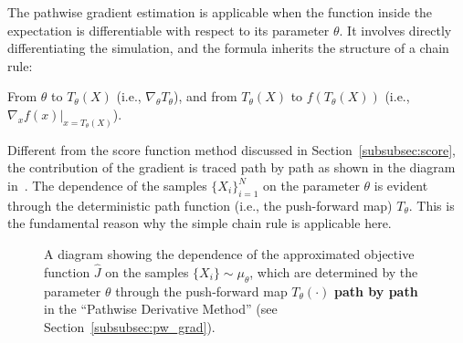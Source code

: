 \documentclass[12pt]{amsart}
\begin{document}
The pathwise gradient estimation is applicable when the function inside the expectation is differentiable with respect to its parameter $\theta$. It involves directly differentiating the simulation, and the formula inherits the structure of a chain rule:
\begin{center}
From $\theta$ to $T_\theta(X)$ (i.e., $\nabla_\theta T_\theta$), and from $T_\theta(X)$ to $f(T_\theta(X))$ (i.e., $\nabla_x f\left(x\right)|_{x=T_\theta(X)}$). \\
\end{center}
Different from the score function method discussed in Section~\ref{subsubsec:score}, the contribution of the gradient is traced path by path as shown in the diagram in~. The dependence of the samples $\{X_i\}_{i=1}^N$ on the parameter $\theta$ is evident through the deterministic path function (i.e., the push-forward map) $T_\theta$. This is the fundamental reason why the simple chain rule is applicable here.  


\begin{figure}
\begin{center}
\usetikzlibrary{arrows.meta}
\end{center}
\caption{A diagram showing the dependence of the approximated objective function $\widehat{J}$  on the samples $\{X_i\} \sim \mu_\theta$, which are determined by the parameter $\theta$ through the push-forward map $T_\theta(\boldsymbol{\cdot})$ \textbf{path by path} in the ``Pathwise Derivative Method'' (see Section~\ref{subsubsec:pw_grad}).\label{fig:pwd_diagram}}
\end{figure}
\end{document}
